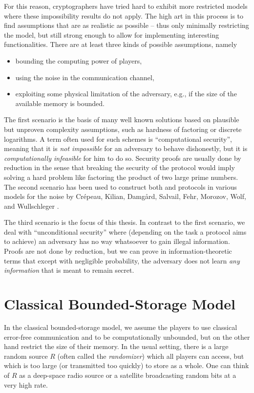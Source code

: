 For this reason, cryptographers have tried hard to exhibit more
restricted models where these impossibility results do not apply. The
high art in this process is to find assumptions that are as realistic
as possible -- thus only minimally restricting the model, but still
strong enough to allow for implementing interesting functionalities.
There are at least three kinds of possible assumptions, namely
\begin{itemize}
\item bounding the computing power of players,
\item using the noise in the communication channel,
\item exploiting some physical limitation of the adversary, e.g., if
  the size of the available memory is bounded.
\end{itemize}

The first scenario is the basis of many well known solutions based on
plausible but unproven complexity assumptions, such as hardness of
factoring or discrete logarithms. A term often used for such schemes
is ``computational security'', meaning
that it is \emph{not impossible} for an adversary to behave
dishonestly, but it is \emph{computationally infeasible} for him to do
so. Security proofs are usually done by reduction in the sense that
breaking the security of the protocol would imply solving a hard
problem like factoring the product of two large prime numbers. The
second scenario has been used to construct both \BC and \pOT protocols
in various models for the noise by Cr\'epeau, Kilian, Damg{\aa}rd,
Salvail, Fehr, Morozov, Wolf, and Wullschleger
\cite{CK88,DKS99,DFMS04,CMW04,Wullschleger07}.

The third scenario is the focus of this thesis. In contrast to the
first scenario, we deal with ``unconditional security'' where (depending on the task a
protocol aims to achieve) an adversary has no way whatsoever to gain
illegal information. Proofs are not done by reduction, but we can
prove in information-theoretic terms that except with negligible
probability, the adversary does not learn \emph{any information} that
is meant to remain secret.

\section{Classical Bounded-Storage Model} \label{sec:ClassicalBSMIntro}
In the classical
bounded-storage model, we assume the players to use classical
error-free communication and to be computationally unbounded, but on the
other hand restrict the size of their memory. In the usual setting,
there is a large random source $R$ (often called the
\emph{randomizer}) which all players can access, but
which is too large (or transmitted too quickly) to store as a whole.
One can think of $R$ as a deep-space radio source or a satellite broadcasting
random bits at a very high rate.

